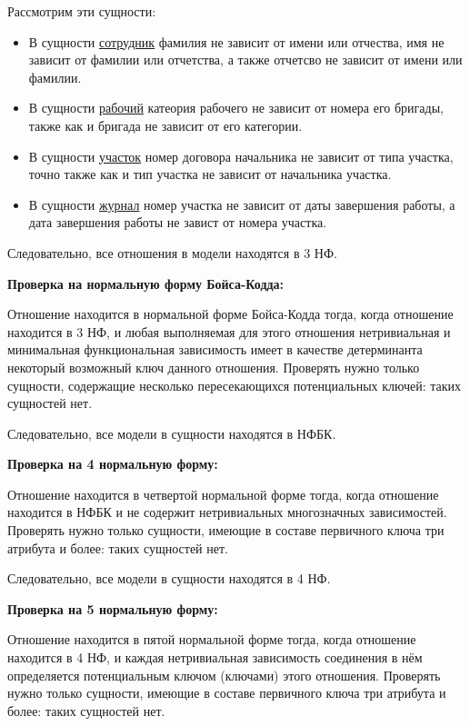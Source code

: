 Рассмотрим эти сущности:

\begin{itemize}
    \item В сущности \underline{сотрудник} фамилия не зависит от имени или отчества, имя не зависит от фамилии или отчетства, а также отчетсво не зависит от имени или фамилии.

    \item В сущности \underline{рабочий} катеория рабочего не зависит от номера его бригады, также как и бригада не зависит от его категории.

    \item В сущности \underline{участок} номер договора начальника не зависит от типа участка, точно также как и тип участка не зависит от начальника участка.

    \item В сущности \underline{журнал} номер участка не зависит от даты завершения работы, а дата завершения работы не завист от номера участка.

\end{itemize}

Следовательно, все отношения в модели находятся в 3 НФ.

{\bf Проверка на нормальную форму Бойса-Кодда:}

Отношение находится в нормальной форме Бойса-Кодда тогда, когда отношение находится в 3 НФ, и любая выполняемая для этого отношения нетривиальная и минимальная функциональная зависимость имеет в качестве детерминанта некоторый возможный ключ данного отношения.
Проверять нужно только сущности, содержащие несколько пересекающихся потенциальных ключей: таких сущностей нет.

Следовательно, все модели в сущности находятся в НФБК.

{\bf Проверка на 4 нормальную форму:}

Отношение находится в четвертой нормальной форме тогда, когда отношение находится в НФБК и не содержит нетривиальных многозначных зависимостей.
Проверять нужно только сущности, имеющие в составе первичного ключа три атрибута и более: таких сущностей нет.

Следовательно, все модели в сущности находятся в 4 НФ.

{\bf Проверка на 5 нормальную форму:}

Отношение находится в пятой нормальной форме тогда, когда отношение находится в 4 НФ, и каждая нетривиальная зависимость соединения в нём определяется потенциальным ключом (ключами) этого отношения.
Проверять нужно только сущности, имеющие в составе первичного ключа три атрибута и более: таких сущностей нет.

